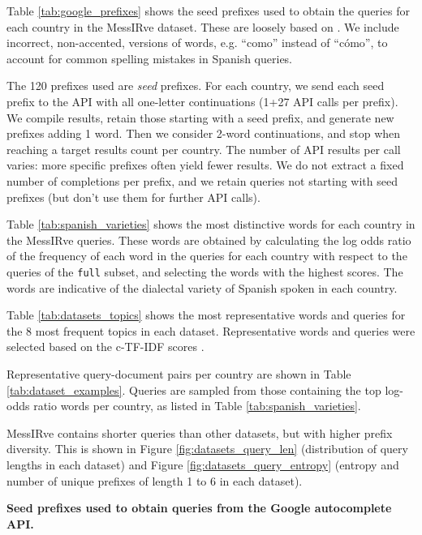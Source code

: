 \documentclass[11pt]{article}
\begin{document}
Table \ref{tab:google_prefixes} shows the seed prefixes used to obtain the queries for each country in the MessIRve dataset. These are loosely based on \citet{khashabi-etal-2021-gooaq-open}. We include incorrect, non-accented, versions of words, e.g. ``como'' instead of ``cómo'', to account for common spelling mistakes in Spanish queries.

The 120 prefixes used are \emph{seed} prefixes. For each country, we send each seed prefix to the API with all one-letter continuations (1+27 API calls per prefix). We compile results, retain those starting with a seed prefix, and generate new prefixes adding 1 word. Then we consider 2-word continuations, and stop when reaching a target results count per country. The number of API results per call varies: more specific prefixes often yield fewer results. We do not extract a fixed number of completions per prefix, and we retain queries not starting with seed prefixes (but don't use them for further API calls). 


Table \ref{tab:spanish_varieties} shows the most distinctive words for each country in the MessIRve queries. These words are obtained by calculating the log odds ratio of the frequency of each word in the queries for each country with respect to the queries of the \texttt{full} subset, and selecting the words with the highest scores. The words are indicative of the dialectal variety of Spanish spoken in each country.

Table \ref{tab:datasets_topics} shows the most representative words and queries for the 8 most frequent topics in each dataset. Representative words and queries were selected based on the c-TF-IDF scores \citep{grootendorst2022bertopic}.

Representative query-document pairs per country are shown in Table \ref{tab:dataset_examples}.
Queries are sampled from those containing the top log-odds ratio words per country, as listed in Table \ref{tab:spanish_varieties}.

MessIRve contains shorter queries than other datasets, but with higher prefix diversity. This is shown in Figure \ref{fig:datasets_query_len} (distribution of query lengths in each dataset) and Figure \ref{fig:datasets_query_entropy} (entropy and number of unique prefixes of length 1 to 6 in each dataset).





\begin{table}[ht!]
  \small
  
  \caption{\textbf{Seed prefixes used to obtain queries from the Google autocomplete API.}
  }
  \label{tab:google_prefixes}
\end{table}
\end{document}
